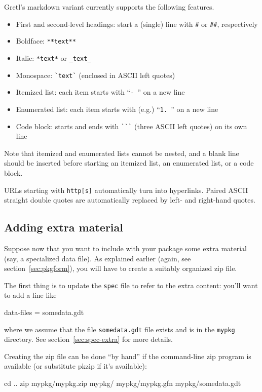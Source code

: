 \documentclass[oneside]{book}
\begin{document}
Gretl's markdown variant currently supports the following features.

\begin{itemize}
\item First and second-level headings: start a (single) line with
  \verb|#| or \verb|##|, respectively
\item Boldface: \verb|**text**|
\item Italic: \verb|*text*| or \verb|_text_|
\item Monospace: \verb|`text`| (enclosed in ASCII left quotes)
\item Itemized list: each item starts with ``\verb|- |'' on a new line
\item Enumerated list: each item starts with (e.g.) ``\verb|1. |''
  on a new line
\item Code block: starts and ends with \verb|```| (three ASCII left
  quotes) on its own line
\end{itemize}

Note that itemized and enumerated lists cannot be nested, and a blank
line should be inserted before starting an itemized list, an
enumerated list, or a code block.

URLs starting with \texttt{http[s]} automatically turn into
hyperlinks.  Paired ASCII straight double quotes are automatically
replaced by left- and right-hand quotes.

\subsection{Adding extra material}

Suppose now that you want to include with your package some extra
material (say, a specialized data file). As explained earlier (again,
see section~\ref{sec:pkgform}), you will have to create a suitably
organized zip file.

The first thing is to update the \texttt{spec} file to refer to the
extra content: you'll want to add a line like
\begin{code}
data-files = somedata.gdt
\end{code}
where we assume that the file \texttt{somedata.gdt} file exists and is
in the \texttt{mypkg} directory. See section~\ref{sec:spec-extra} for
more details.

Creating the zip file can be done ``by hand'' if the command-line
\textsf{zip} program is available (or substitute \textsf{pkzip} if
it's available):
\begin{code}
cd ..
zip mypkg/mypkg.zip mypkg/ mypkg/mypkg.gfn mypkg/somedata.gdt
\end{code}
\end{document}
